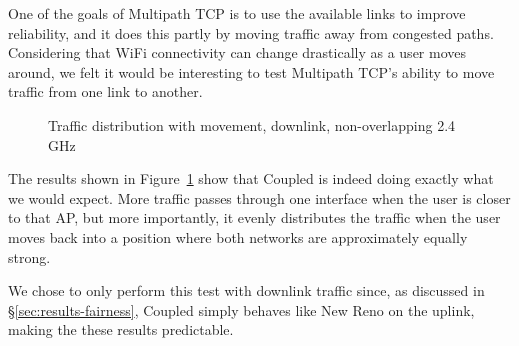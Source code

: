 One of the goals of Multipath TCP is to use the available links to improve
reliability, and it does this partly by moving traffic away from congested
paths. Considering that WiFi connectivity can change drastically as a user moves around,
we felt it would be interesting to test Multipath TCP's ability to move traffic
from one link to another.

\begin{figure}[h]
 \centering
 
 \caption{Traffic distribution with movement, downlink, non-overlapping 2.4 GHz}\label{graph:mobility}
\end{figure}

The results shown in
Figure~\ref{graph:mobility} show that Coupled is indeed doing exactly what
we would expect. More traffic passes through one interface when the user is
closer to that AP, but more importantly, it evenly distributes the
traffic when the user moves back into a position where both networks are
approximately equally strong.

We chose to only perform this test with downlink traffic since, as discussed in
\S\ref{sec:results-fairness}, Coupled simply behaves like New Reno on the uplink,
making the these results predictable.

